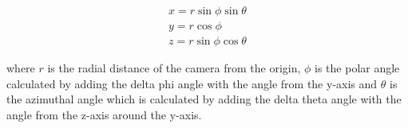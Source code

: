 
\begin{gather}
	x = r\sin\phi\sin\theta \\
	y = r\cos\phi \\
	z = r\sin\phi\cos\theta
\end{gather}

where $r$ is the radial distance of the camera from the origin, $\phi$ is the polar angle calculated by adding the delta phi angle with the angle from the y-axis and $\theta$ is the azimuthal angle which is calculated by adding the delta theta angle with the angle from the z-axis around the y-axis.
